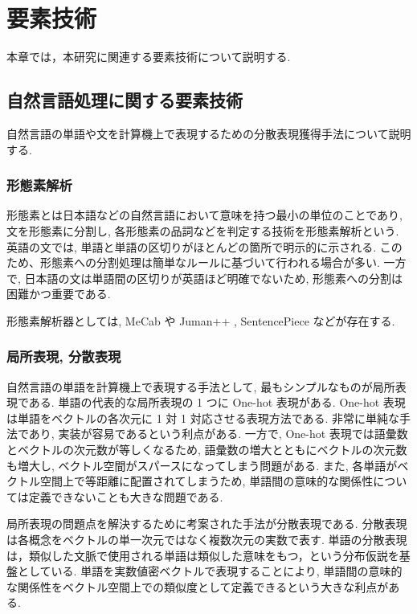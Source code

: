 \newpage
\changeindent{0cm}
\section{要素技術}
\changeindent{2cm}

本章では，本研究に関連する要素技術について説明する.

\changeindent{0cm}
\subsection{自然言語処理に関する要素技術}
\changeindent{2cm}

自然言語の単語や文を計算機上で表現するための分散表現獲得手法について説明する.

\changeindent{0cm}
\subsubsection{形態素解析}
\changeindent{2cm}

形態素とは日本語などの自然言語において意味を持つ最小の単位のことであり,
文を形態素に分割し, 各形態素の品詞などを判定する技術を形態素解析という.
英語の文では, 単語と単語の区切りがほとんどの箇所で明示的に示される.
このため、形態素への分割処理は簡単なルールに基づいて行われる場合が多い.
一方で, 日本語の文は単語間の区切りが英語ほど明確でないため,
形態素への分割は困難かつ重要である.

形態素解析器としては, MeCab \cite{mecab} や Juman++ \cite{jumanpp}, SentencePiece \cite{DBLP:journals/corr/abs-1808-06226} などが存在する.

\changeindent{0cm}
\subsubsection{局所表現, 分散表現}
\changeindent{2cm}
自然言語の単語を計算機上で表現する手法として, 最もシンプルなものが局所表現である.
単語の代表的な局所表現の 1 つに One-hot 表現がある.
One-hot 表現は単語をベクトルの各次元に 1 対 1 対応させる表現方法である.
非常に単純な手法であり, 実装が容易であるという利点がある.
一方で, One-hot 表現では語彙数とベクトルの次元数が等しくなるため,
語彙数の増大とともにベクトルの次元数も増大し, ベクトル空間がスパースになってしまう問題がある.
また, 各単語がベクトル空間上で等距離に配置されてしまうため,
単語間の意味的な関係性については定義できないことも大きな問題である.

局所表現の問題点を解決するために考案された手法が分散表現である. 分散表現は各概念をベクトルの単一次元ではなく複数次元の実数で表す.
単語の分散表現は，類似した文脈で使用される単語は類似した意味をもつ，という分布仮説を基盤としている.
単語を実数値密ベクトルで表現することにより,
単語間の意味的な関係性をベクトル空間上での類似度として定義できるという大きな利点がある.

